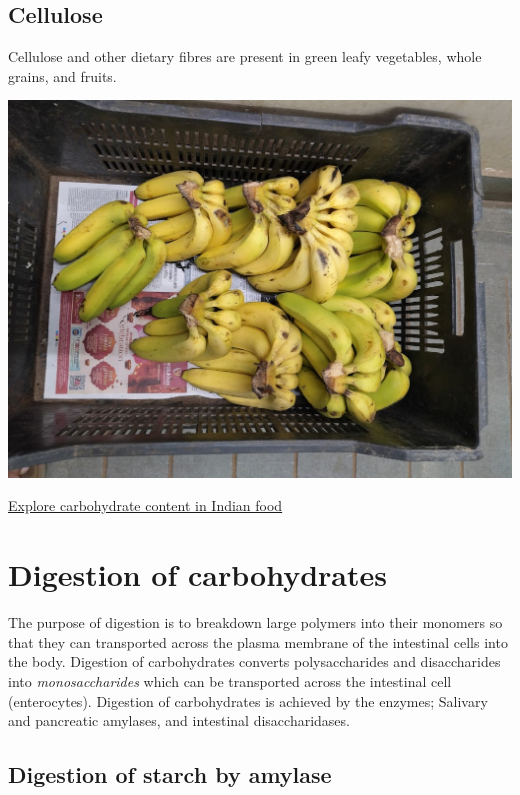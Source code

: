 \documentclass[
]{book}
\begin{document}
\subsection*{Cellulose}\label{cellulose}

Cellulose and other dietary fibres are present in green leafy vegetables, whole grains, and fruits.

\includegraphics{Images/Fibre.jpg}

\href{padmanaban55.github.io/CarbohydrateContent}{Explore carbohydrate content in Indian food}

\section{Digestion of carbohydrates}\label{digestion-of-carbohydrates}

The purpose of digestion is to breakdown large polymers into their monomers so that they can transported across the plasma membrane of the intestinal cells into the body. Digestion of carbohydrates converts polysaccharides and disaccharides into \emph{monosaccharides} which can be transported across the intestinal cell (enterocytes). Digestion of carbohydrates is achieved by the enzymes; Salivary and pancreatic amylases, and intestinal disaccharidases.

\subsection{Digestion of starch by amylase}\label{digestion-of-starch-by-amylase}
\end{document}
